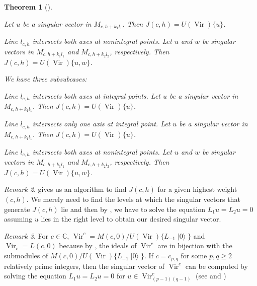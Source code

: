 \documentclass[a4paper, 12pt, reqno]{amsart}
\newtheorem{theorem}{Theorem}[section]
\theoremstyle{remark}
\newtheorem{remark}[theorem]{Remark}
\numberwithin{equation}{subsection}
\DeclareMathOperator{\Vir}{Vir}
\DeclareMathOperator{\vac}{|0\rangle}
\begin{document}
\begin{theorem}[{\cite{astashkevich_structure_1997}}]
\begin{description}[leftmargin = !]
\begin{description}[leftmargin = !]
\begin{description}[leftmargin = !]
        Let $u$ be a singular vector in $M_{c, h + k_1l_1}$.
        Then $J(c, h) = U(\Vir)\{u\}$.
      \item[Subsubcase III$_-$] Line $l_{c, h}$ intersects both axes at nonintegral points.
        Let $u$ and $w$ be singular vectors in $M_{c, h + k_1l_1}$ and $M_{c, h + k_2l_2}$, respectively.
        Then $J(c, h) = U(\Vir)\{u, w\}$.
      \end{description}
    \item[Subcase $c\ge 25$] We have three subsubcases:
      \begin{description}[leftmargin = !]
      \item[Subsubcase III$^{00}_+$] Line $l_{c, h}$ intersects both axes at integral points.
        Let $u$ be a singular vector in $M_{c, h + k_1l_1}$.
        Then $J(c, h) = U(\Vir)\{u\}$.
      \item[Subsubcase III$^0_+$] Line $l_{c, h}$ intersects only one axis at integral point.
        Let $u$ be a singular vector in $M_{c, h + k_1l_1}$.
        Then $J(c, h) = U(\Vir)\{u\}$.
      \item[Subsubcase III$_+$] Line $l_{c, h}$ intersects both axes at nonintegral points.
        Let $u$ and $w$ be singular vectors in $M_{c, h + k_1l_1}$ and $M_{c, h + k_2l_2}$, respectively.
        Then $J(c, h) = U(\Vir)\{u, w\}$.
      \end{description}
    \end{description}
  \end{description}
\end{theorem}

\begin{remark}
  \label{rmk:25}
   gives us an algorithm to find $J(c, h)$ for a given highest weight $(c, h)$.
  We merely need to find the levels at which the singular vectors that generate $J(c, h)$ lie and then by , we have to solve the equation $L_1u = L_2 u = 0$ assuming $u$ lies in the right level to obtain our desired singular vector.
\end{remark}

\begin{remark}
  \label{rmk:26}
  For $c \in \mathbb{C}$, $\Vir^c = M(c, 0)/U(\Vir)\{L_{-1}\vac\}$ and $\Vir_c = L(c, 0)$ because by , the ideals of $\Vir^c$ are in bijection with the submodules of $M(c, 0)/U(\Vir)\{L_{-1}\vac\}$.
  If $c = c_{p, q}$ for some $p, q \ge 2$ relatively prime integers, then the singular vector of $\Vir^c$ can be computed by solving the equation $L_1u = L_2u = 0$ for $u \in \Vir^c_{(p - 1)(q - 1)}$ (see  and )
\end{remark}
\end{document}
